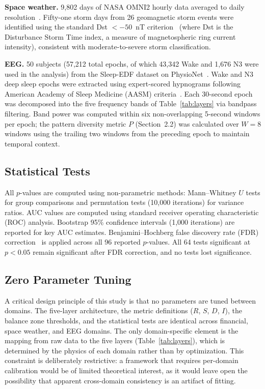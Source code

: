 \documentclass[aip,cha,reprint,amsmath,amssymb]{revtex4-2}
\begin{document}
\textbf{Space weather.} 9,802 days of NASA OMNI2 hourly data averaged to daily resolution~\cite{papitashvili2020}. Fifty-one storm days from 26 geomagnetic storm events were identified using the standard Dst $< -50$~nT criterion~\cite{gonzalez1994} (where Dst is the Disturbance Storm Time index, a measure of magnetospheric ring current intensity), consistent with moderate-to-severe storm classification.

\textbf{EEG.} 50 subjects (57,212 total epochs, of which 43,342 Wake and 1,676 N3 were used in the analysis) from the Sleep-EDF dataset on PhysioNet~\cite{kemp2000,goldberger2000}. Wake and N3 deep sleep epochs were extracted using expert-scored hypnograms following American Academy of Sleep Medicine (AASM) criteria~\cite{berry2017}. Each 30-second epoch was decomposed into the five frequency bands of Table~\ref{tab:layers} via bandpass filtering. Band power was computed within six non-overlapping 5-second windows per epoch; the pattern diversity metric $P$ (Section~2.2) was calculated over $W = 8$ windows using the trailing two windows from the preceding epoch to maintain temporal context.

\subsection{Statistical Tests}

All $p$-values are computed using non-parametric methods: Mann--Whitney $U$ tests for group comparisons and permutation tests (10,000 iterations) for variance ratios. AUC values are computed using standard receiver operating characteristic (ROC) analysis. Bootstrap 95\% confidence intervals (1,000 iterations) are reported for key AUC estimates. Benjamini--Hochberg false discovery rate (FDR) correction~\cite{benjamini1995} is applied across all 96 reported $p$-values. All 64 tests significant at $p < 0.05$ remain significant after FDR correction, and no tests lost significance.

\subsection{Zero Parameter Tuning}

A critical design principle of this study is that no parameters are tuned between domains. The five-layer architecture, the metric definitions ($R$, $S$, $D$, $I$), the balance zone thresholds, and the statistical tests are identical across financial, space weather, and EEG domains. The only domain-specific element is the mapping from raw data to the five layers (Table~\ref{tab:layers}), which is determined by the physics of each domain rather than by optimization. This constraint is deliberately restrictive: a framework that requires per-domain calibration would be of limited theoretical interest, as it would leave open the possibility that apparent cross-domain consistency is an artifact of fitting.
\end{document}
